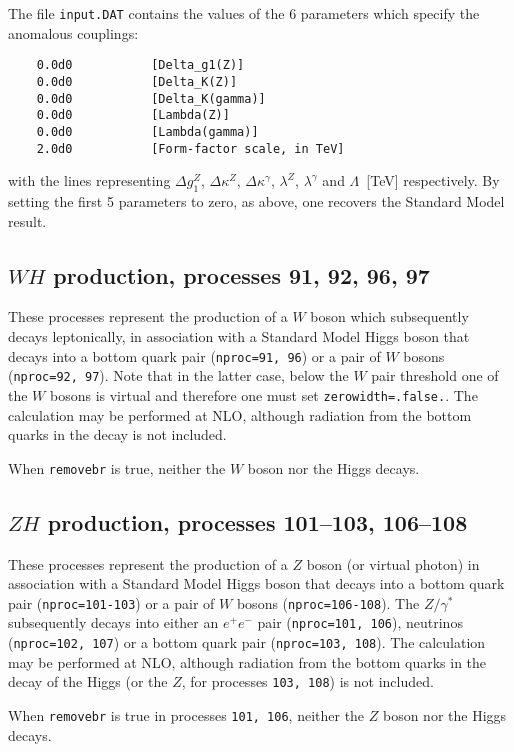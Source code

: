 \documentclass[12pt]{article}
\begin{document}
The file {\tt input.DAT} contains the values of the $6$ parameters
which specify the anomalous couplings:
\begin{verbatim}
    0.0d0           [Delta_g1(Z)]
    0.0d0           [Delta_K(Z)]
    0.0d0           [Delta_K(gamma)]
    0.0d0           [Lambda(Z)]
    0.0d0           [Lambda(gamma)]
    2.0d0           [Form-factor scale, in TeV]
\end{verbatim}
with the lines representing $\Delta g_1^Z$, $\Delta \kappa^Z$,
$\Delta \kappa^\gamma$, $\lambda^Z$, $\lambda^\gamma$ and
$\Lambda$~[TeV] respectively. By setting the first 5 parameters to zero,
as above, one recovers the Standard Model result.

\subsection{$WH$ production, processes 91, 92, 96, 97}
\label{subsec:wh}

These processes represent the production of a $W$ boson which subsequently
decays leptonically, in association with a Standard Model Higgs boson that
decays into a bottom quark pair ({\tt nproc=91, 96}) or a pair of $W$ bosons
({\tt nproc=92, 97}).  Note that in the latter case, below the $W$ pair threshold
one of the $W$ bosons is virtual and therefore one must set {\tt zerowidth=.false.}.
The calculation may be performed at NLO, although radiation from the
bottom quarks in the decay is not included.

When {\tt removebr} is true, neither the $W$ boson nor the Higgs decays.

\subsection{$ZH$ production, processes 101--103, 106--108}
\label{subsec:zh}

These processes represent the production of a $Z$ boson (or virtual photon)
in association with a Standard Model Higgs boson that
decays into a bottom quark pair ({\tt nproc=101-103}) or a pair of $W$ bosons
({\tt nproc=106-108}). The $Z/\gamma^*$ subsequently decays into 
either an $e^+ e^-$ pair ({\tt nproc=101, 106}), neutrinos ({\tt nproc=102, 107})
or a bottom quark pair ({\tt nproc=103, 108}).
The calculation may be performed at NLO, although radiation from the
bottom quarks in the decay of the Higgs (or the $Z$, for processes
{\tt 103, 108}) is not included.

When {\tt removebr} is true in processes {\tt 101, 106}, neither the $Z$ boson
nor the Higgs decays.
\end{document}
